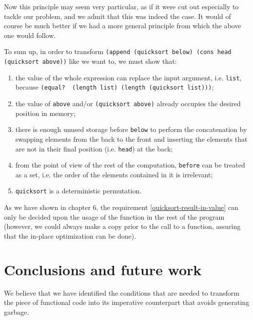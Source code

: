 Now this principle may seem very particular, as if it were
cut out especially to tackle our problem, and we admit that this was
indeed the case. It would of course be much better if we had a more
general principle from which the above one would follow.

To sum up, in order to transform \texttt{(append (quicksort below)
  (cons head (quicksort above))} like we want to, we must show that:
\begin{enumerate}
  
\item \label{quicksort-result-in-value} the value of the whole
  expression can replace the input argument,
  i.e. \texttt{list}, because
  \texttt{(equal?\,\,(length list) (length (quicksort list)))};
  
\item \label{quicksort-final-layout} the value of \texttt{above}
  and/or \texttt{(quicksort above)} already occupies the desired
  position in memory;
  
\item \label{quicksort-free-storage} there is enough unused storage
  before \texttt{below} to perform the concatenation by swapping
  elements from the back to the front and inserting the elements
  that are not in their final position (i.e. \texttt{head}) at the back;
  
\item \label{quicksort-irrelevant-order} from the point of view
  of the rest of the computation, \texttt{before} can be treated
  as a set, i.e. the order of the elements contained in it is irrelevant;

\item \label{quicksort-deterministic-permutation }\texttt{quicksort}
  is a deterministic permutation.

\end{enumerate}

As we have shown in chapter 6, the requirement \ref{quicksort-result-in-value}
can only be decided upon the usage of the function in the rest of the program
(however, we could always make a copy prior to the call to a function,
assuring that the in-place optimization can be done).

\section{Conclusions and future work}

We believe that we have identified the conditions that are needed
to transform the piece of functional code into its imperative counterpart
that avoids generating garbage.


